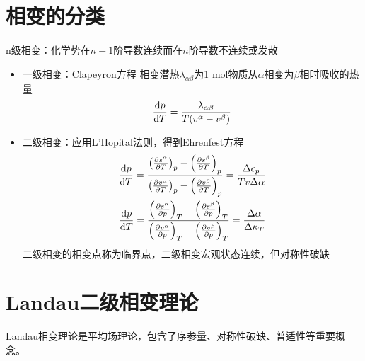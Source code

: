 \section{相变的分类}

n级相变：化学势在$n-1$阶导数连续而在$n$阶导数不连续或发散
\begin{itemize}
    \item 一级相变：Clapeyron方程
    相变潜热$\lambda_{\alpha \beta}$为1 mol物质从$\alpha$相变为$\beta$相时吸收的热量
    \begin{gather*}
        \frac{\mathrm{d} p}{\mathrm{d} T} = \frac{\lambda_{\alpha \beta}}{T (v^{\alpha} - v^{\beta})}
    \end{gather*}
    \item 二级相变：应用L'Hopital法则，得到Ehrenfest方程
    \begin{gather*}
        \frac{\mathrm{d} p}{\mathrm{d} T} = \frac{\left(\frac{\partial s^{\alpha}}{\partial T}\right)_p-\left(\frac{\partial s^{\beta}}{\partial T}\right)_p}{\left(\frac{\partial v^{\alpha}}{\partial T}\right)_p-\left(\frac{\partial v^{\beta}}{\partial T}\right)_p} = \frac{\Delta c_p}{T v \Delta \alpha}
        \\
        \frac{\mathrm{d} p}{\mathrm{d} T} = \frac{\left(\frac{\partial s^{\alpha}}{\partial p}\right)_T-\left(\frac{\partial s^{\beta}}{\partial p}\right)_T}{\left(\frac{\partial v^{\alpha}}{\partial p}\right)_T-\left(\frac{\partial v^{\beta}}{\partial p}\right)_T} = \frac{\Delta \alpha}{\Delta \kappa_T}
    \end{gather*}
    二级相变的相变点称为临界点，二级相变宏观状态连续，但对称性破缺
\end{itemize}

\section{Landau二级相变理论}

Landau相变理论是平均场理论，包含了序参量、对称性破缺、普适性等重要概念。

